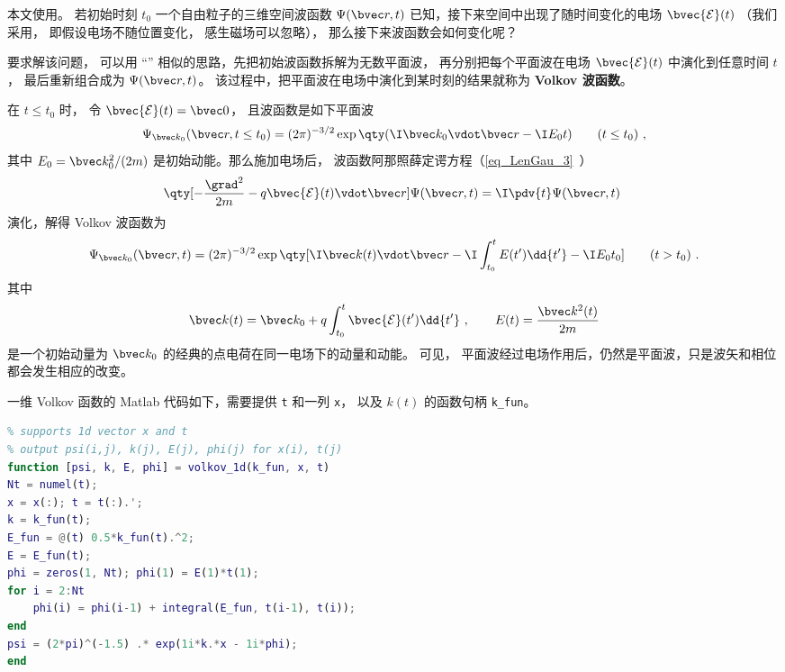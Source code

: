 
本文使用。 若初始时刻 $t_0$ 一个自由粒子的三维空间波函数 $\Psi(\bvec r,t)$ 已知，接下来空间中出现了随时间变化的电场 $\bvec {\mathcal E}(t)$ （我们采用， 即假设电场不随位置变化， 感生磁场可以忽略）， 那么接下来波函数会如何变化呢？

要求解该问题， 可以用 “” 相似的思路，先把初始波函数拆解为无数平面波， 再分别把每个平面波在电场 $\bvec {\mathcal E}(t)$ 中演化到任意时间 $t$， 最后重新组合成为 $\Psi(\bvec r,t)$。 该过程中，把平面波在电场中演化到某时刻的结果就称为 \textbf{Volkov 波函数}。

在 $t \le t_0$ 时， 令 $\bvec {\mathcal E}(t) = \bvec 0$， 且波函数是如下平面波
\begin{equation}\label{eq_Volkov_3}
\Psi_{\bvec k_0}(\bvec r, t \le t_0) = (2\pi)^{-3/2} \exp\qty(\I\bvec k_0 \vdot \bvec r - \I E_0 t) \qquad (t \le t_0)~,
\end{equation}
其中 $E_0 = \bvec k_0^2/(2m)$ 是初始动能。那么施加电场后，
波函数阿那照薛定谔方程（\autoref{eq_LenGau_3}~）
\begin{equation}
\qty[-\frac{\grad^2}{2m} - q \bvec {\mathcal E}(t) \vdot \bvec r] \Psi(\bvec r,t) = \I \pdv{t} \Psi(\bvec r,t)~
\end{equation}
演化，解得 Volkov 波函数为
\begin{equation}\label{eq_Volkov_4}
\Psi_{\bvec k_0}(\bvec r, t) = (2\pi)^{-3/2} \exp\qty[\I \bvec k(t)\vdot \bvec r - \I\int_{t_0}^t E(t') \dd{t'} - \I E_0 t_0] \qquad (t > t_0)~.
\end{equation}
其中
\begin{equation}\label{eq_Volkov_5}
\bvec k(t) = \bvec k_0 + q\int_{t_0}^t \bvec {\mathcal E}(t') \dd{t'}~,
\qquad
E(t) = \frac{\bvec k^2(t)}{2m}
\end{equation}
是一个初始动量为 $\bvec k_0$ 的经典的点电荷在同一电场下的动量和动能。 可见， 平面波经过电场作用后，仍然是平面波，只是波矢和相位都会发生相应的改变。

一维 Volkov 函数的 Matlab 代码如下，需要提供 \verb`t` 和一列 \verb`x`， 以及 $k(t)$ 的函数句柄 \verb`k_fun`。
\begin{lstlisting}[language=matlab, caption=volkov\_1d.m]
% Volkov wave function in 1D
% supports 1d vector x and t
% output psi(i,j), k(j), E(j), phi(j) for x(i), t(j)
function [psi, k, E, phi] = volkov_1d(k_fun, x, t)
Nt = numel(t);
x = x(:); t = t(:).';
k = k_fun(t);
E_fun = @(t) 0.5*k_fun(t).^2;
E = E_fun(t);
phi = zeros(1, Nt); phi(1) = E(1)*t(1);
for i = 2:Nt
    phi(i) = phi(i-1) + integral(E_fun, t(i-1), t(i));
end
psi = (2*pi)^(-1.5) .* exp(1i*k.*x - 1i*phi);
end
\end{lstlisting}


